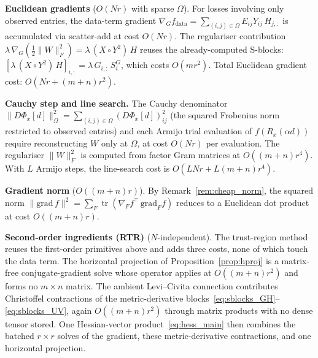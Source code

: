 \documentclass[letterpaper, 10 pt, conference]{ieeeconf}
\newcommand{\tr}{\operatorname{tr}}
\newcommand{\Had}{\circ}
\theoremstyle{plain}
\theoremstyle{definition}
\theoremstyle{remark}
\begin{document}
\noindent\textbf{Euclidean gradients} ($O(Nr)$ with sparse $\Omega$).
For losses involving only observed entries, the data-term gradient $\nabla_G f_{\mathrm{data}} = \sum_{(i,j) \in \Omega} E_{ij} Y_{ij}\,H_{j,:}$ is accumulated via scatter-add at cost $O(Nr)$.
The regulariser contribution $\lambda\,\nabla_G (\tfrac{1}{2}\|W\|_F^2) = \lambda\,(X\Had Y^2)\,H$ reuses the already-computed S-blocks:
$[\lambda\,(X\Had Y^2)\,H]_{i,:} = \lambda\,G_{i,:}\,S_i^G$, which costs $O(mr^2)$.
Total Euclidean gradient cost: $O(Nr + (m{+}n)r^2)$. 

\noindent\textbf{Cauchy step and line search.}
The Cauchy denominator $\|D\Phi_x[d]\|_{\Omega}^2 = \sum_{(i,j)\in\Omega} (D\Phi_x[d])_{ij}^2$ (the squared Frobenius norm restricted to observed entries) and each Armijo trial evaluation of $f(R_x(\alpha d))$ require reconstructing $W$ only at $\Omega$, at cost $O(Nr)$ per evaluation.
The regulariser $\|W\|_F^2$ is computed from factor Gram matrices at $O((m{+}n)r^4)$.
With $L$ Armijo steps, the line-search cost is $O(LNr + L(m{+}n)r^4)$. 

\noindent\textbf{Gradient norm} ($O((m{+}n)r)$).
By Remark~\ref{rem:cheap_norm}, the squared norm $\|\mathrm{grad}\,f\|^2 = \sum_F \tr(\nabla_F f^\top\,\mathrm{grad}_F f)$ reduces to a Euclidean dot product at cost $O((m{+}n)r)$. 

\noindent\textbf{Second-order ingredients (RTR)} ($N$-independent).
The trust-region method reuses the first-order primitives above and adds three costs, none of which touch the data term. The horizontal projection of Proposition~\ref{prop:hproj} is a matrix-free conjugate-gradient solve whose operator applies at $O((m{+}n)r^2)$ and forms no $m\times n$ matrix. The ambient Levi--Civita connection contributes Christoffel contractions of the metric-derivative blocks~\eqref{eq:sblocks_GH}--\eqref{eq:sblocks_UV}, again $O((m{+}n)r^2)$ through matrix products with no dense tensor stored. One Hessian-vector product~\eqref{eq:hess_main} then combines the batched $r\times r$ solves of the gradient, these metric-derivative contractions, and one horizontal projection.
\end{document}
